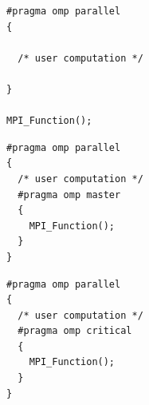 

\newsavebox\mpiOutsideBox
\begin{lrbox}{\mpiOutsideBox}
\begin{lstlisting}[linewidth=0.45\columnwidth]
#pragma omp parallel
{

  /* user computation */

}

MPI_Function();
\end{lstlisting}
\end{lrbox}

\newsavebox\mpiInsideMasterBox
\begin{lrbox}{\mpiInsideMasterBox}
\begin{lstlisting}[linewidth=0.45\columnwidth]
#pragma omp parallel
{
  /* user computation */
  #pragma omp master
  {
    MPI_Function();
  }
}
\end{lstlisting}
\end{lrbox}

\newsavebox\mpiInsideCriticalBox
\begin{lrbox}{\mpiInsideCriticalBox}
\begin{lstlisting}[linewidth=0.45\columnwidth]
#pragma omp parallel
{
  /* user computation */
  #pragma omp critical
  {
    MPI_Function();
  }
}
\end{lstlisting}
\end{lrbox}

